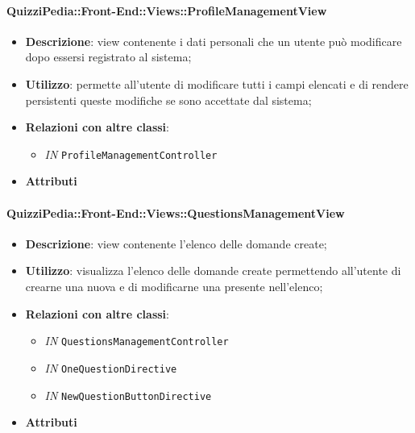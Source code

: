 \paragraph{QuizziPedia::Front-End::Views::ProfileManagementView}
\begin{itemize}
	\item \textbf{Descrizione}: view contenente i dati personali che un utente può modificare dopo essersi registrato al sistema;
	\item \textbf{Utilizzo}: permette all'utente di modificare tutti i campi elencati e di rendere persistenti queste modifiche se sono accettate dal sistema;
	\item \textbf{Relazioni con altre classi}:
	\begin{itemize}
		\item \textit{IN} \texttt{ProfileManagementController} \\
	\end{itemize}
	\item \textbf{Attributi}
\end{itemize}

\paragraph{QuizziPedia::Front-End::Views::QuestionsManagementView}
\begin{itemize}
	\item \textbf{Descrizione}: view contenente l'elenco delle domande create; 
	\item \textbf{Utilizzo}: visualizza l'elenco delle domande create permettendo all'utente di crearne una nuova e di modificarne una presente nell'elenco;
	\item \textbf{Relazioni con altre classi}:
	\begin{itemize}
		\item \textit{IN} \texttt{QuestionsManagementController} \\
		\item \textit{IN} \texttt{OneQuestionDirective} \\
		\item \textit{IN} \texttt{NewQuestionButtonDirective} \\ 
	\end{itemize}
	\item \textbf{Attributi}
\end{itemize}

